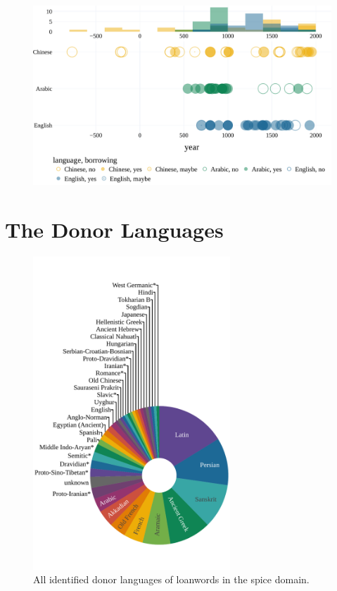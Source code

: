 \begin{figure}[!ht]
  \centering
  \includegraphics[width=\linewidth]{imgs/plots/attestation_and_borrowing_compact.pdf}
  \caption{}
  \label{fig:attestation_and_borrowing_compact}
\end{figure}

\blindtext

\section{The Donor Languages}

\begin{figure}
  \vspace{-\baselineskip}
  \includegraphics[width=0.66\textwidth]{imgs/plots/donors_pie.pdf}
  \caption{All identified donor languages of loanwords in the spice domain.}
  \label{fig:donor_pie}
\end{figure}

